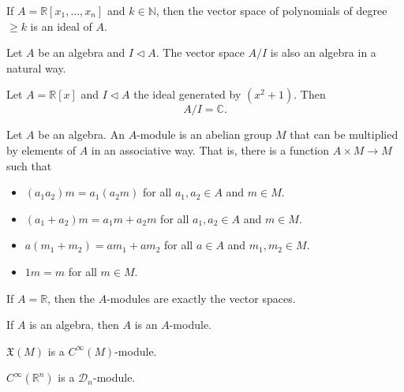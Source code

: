 \documentclass{ximera}
\begin{document}
\begin{example} 
 If $A = \mathbb{R} [x_1, \ldots , x_n]$ and $k \in \mathbb{N}$, then the vector space of polynomials of degree $\geq k$ is an ideal of $A$.
\end{example}

\begin{definition}
    Let $A$ be an algebra and $I \triangleleft A$. The vector space $A/ I$ is also an algebra in a natural way.
\end{definition}

\begin{example}
     Let $A = \mathbb{R}[x]$ and $I\triangleleft A$ the ideal generated by $( x^2  + 1 ) $. Then 
    \[ A / I = \mathbb{C} . \]
\end{example}



\begin{definition}
 [Modules]   Let $A$ be an algebra. An $A$-module is an abelian group $M$ that can be multiplied by elements of $A$ in an associative way. That is, there is a function $A \times M \to M$ such that 
    \begin{itemize}
        \item $(a_1a_2 )m = a_1 (a_2m)$ for all $a_1, a_2 \in A$ and $m \in M$.
        \item $(a_1 + a_2)m = a_1 m + a_2 m$ for all $a_1, a_2 \in A$ and $m \in M$.
        \item $a(m_1 + m_2 ) = a m_1 + a m_2$ for all $a \in A$ and $m_1, m_2 \in M$.
        \item $1m = m $ for all $m \in M$.
    \end{itemize}
\end{definition}


\begin{example}
If $A = \mathbb{R}$, then the $A$-modules are exactly the vector spaces.
\end{example}

\begin{example}
If $A$ is an algebra, then $A$ is an $A$-module. 
\end{example}



\begin{example}
$\mathfrak{X}(M)$ is a $C^{\infty}(M)$-module. 
\end{example}

\begin{example}
    $C^{\infty}(\mathbb{R}^n )$ is a $\mathcal{D}_n$-module. 
\end{example}
\end{document}
